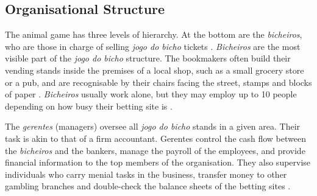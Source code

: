 \subsection{Organisational Structure}
\label{sub:organisation}

The animal game has three levels of hierarchy. At the bottom are the \emph{bicheiros}, who are those in charge of selling \emph{jogo do bicho} tickets \citep{chazkel2007beyond, chazkel2011laws, da1999aguias, labronici2014sorteio, magalhaes2005ganhou, misse2007illegal}. \emph{Bicheiros} are the most visible part of the \emph{jogo do bicho} structure. The bookmakers often build their vending stands inside the premises of a local shop, such as a small grocery store or a pub, and are recognisable by their chairs facing the street, stamps and blocks of paper \citep[259]{chazkel2011laws}. \emph{Bicheiros} usually work alone, but they may employ up to 10 people depending on how busy their betting site is \citep[69]{labronici2014sorteio}.

The \emph{gerentes} (managers) oversee all \emph{jogo do bicho} stands in a given area. Their task is akin to that of a firm accountant. Gerentes control the cash flow between the \emph{bicheiros} and the bankers, manage the payroll of the employees, and provide financial information to the top members of the organisation. They also supervise individuals who carry menial tasks in the business, transfer money to other gambling branches and double-check the balance sheets of the betting sites \citetext{\citealp[71]{labronici2012paratodos}; \citealp[142]{misse2007illegal}}.

